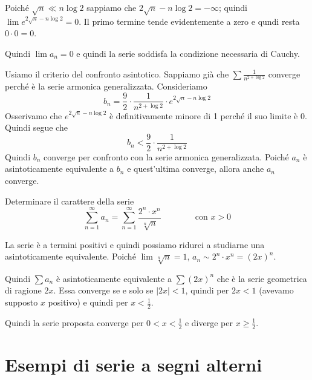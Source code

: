 \begin{example}
Poiché $\sqrt{n} \ll n \log 2$ sappiamo che $2\sqrt{n} - n \log 2 = -\infty$; quindi $\lim e^{2\sqrt{n} - n \log 2} = 0$. Il primo termine tende evidentemente a zero e qundi resta $0 \cdot 0 = 0$.

Quindi $\lim a_n = 0$ e quindi la serie soddisfa la condizione necessaria di Cauchy.

Usiamo il criterio del confronto asintotico. Sappiamo già che $\sum \frac{1}{n^{2 + \log 2}}$ converge perché è la serie armonica generalizzata. Consideriamo
\begin{equation*}
b_n = \frac{9}{2} \cdot \frac{1}{n^{2 + \log 2}} \cdot e^{2\sqrt{n} - n\log 2}
\end{equation*}
Osserivamo che $e^{2\sqrt{n} - n\log 2}$ è definitivamente minore di 1 perché il suo limite è 0. Quindi segue che 
\begin{equation*}
b_n < \frac{9}{2} \cdot \frac{1}{n^{2 + \log 2}}
\end{equation*}
Quindi $b_n$ converge per confronto con la serie armonica generalizzata. Poiché $a_n$ è asintoticamente equivalente a $b_n$ e quest'ultima converge, allora anche $a_n$ converge.
\end{example}

\begin{example}
Determinare il carattere della serie
\begin{equation*}
\sum_{n=1}^\infty a_n = \sum_{n=1}^\infty \frac{2^n \cdot x^n}{\sqrt[n]{n}} \qquad \qquad \text{con } x > 0
\end{equation*}

La serie è a termini positivi e quindi possiamo ridurci a studiarne una asintoticamente equivalente. Poiché $\lim \sqrt[n]{n} = 1$, $a_n \sim 2^n \cdot x^n = (2x)^n$. 

Quindi $\sum a_n$ è asintoticamente equivalente a $\sum (2x)^n$ che è la serie geometrica di ragione $2x$. Essa converge se e solo se $|2x| < 1$, quindi per $2x < 1$ (avevamo supposto $x$ positivo) e quindi per $x < \frac{1}{2}$.

Quindi la serie proposta converge per $0 < x < \frac{1}{2}$ e diverge per $x \ge \frac{1}{2}$.
\end{example}

\section{Esempi di serie a segni alterni}

